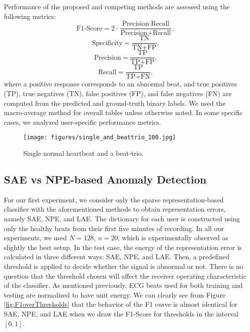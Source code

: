 \documentclass[journal,transmag]{IEEEtran}
\begin{document}
Performance of the proposed and competing methods are assessed using the following metrics:
\begin{equation}
    \text{F1-Score} = 2 \cdot \frac{ \text{Precision} \cdot \text{Recall}}{  \text{Precision} + \text{Recall}},
\end{equation}
\begin{equation}
    \text{Specificity} = \frac{\text{TN}}{\text{TN} + \text{FP}},
\end{equation}
\begin{equation}
    \text{Precision} = \frac{\text{TP}}{\text{TP} + \text{FP}},
\end{equation}
\begin{equation}
    \text{Recall} = \frac{\text{TP}}{\text{TP} + \text{FN}},
\end{equation}
where a positive response corresponds to an abnormal beat, and true positives (TP), true negatives (TN), false positives (FP), and false negatives (FN) are computed from the predicted and ground-truth binary labels. We used the macro-average method for overall tables unless otherwise noted. In some specific cases, we analyzed user-specific performance metrics. 

\begin{figure}[!htbp]
    \captionsetup{font=footnotesize}
    \centering
    \texttt{[image: figures/single\_and\_beattrio\_100.jpg]}
    \caption{Single normal heartbeat and a beat-trio.}
    \label{fig:single_and_beattrio_100}
\end{figure}

\subsection{SAE vs NPE-based Anomaly Detection}
For our first experiment, we consider only the sparse representation-based classifier with the aforementioned methods to obtain representation errors, namely SAE, NPE, and LAE. The dictionary for each user is constructed using only the healthy beats from their first five minutes of recording. In all our experiments, we used $N=128$, $n=20$, which is experimentally observed as slightly the best setup.
In the test case, the energy of the representation error is calculated in three different ways: SAE, NPE, and LAE. Then, a predefined threshold is applied to decide whether the signal is abnormal or not. There is no question that the threshold chosen will affect the receiver operating characteristic of the classifier. As mentioned previously, ECG beats used for both training and testing are normalized to have unit energy. We can clearly see from Figure \ref{fig:F1overThresholds} that the behavior of the F1 curve is almost identical for SAE, NPE, and LAE when we draw the F1-Score for thresholds in the interval $\left[0,1\right]$.
\end{document}
